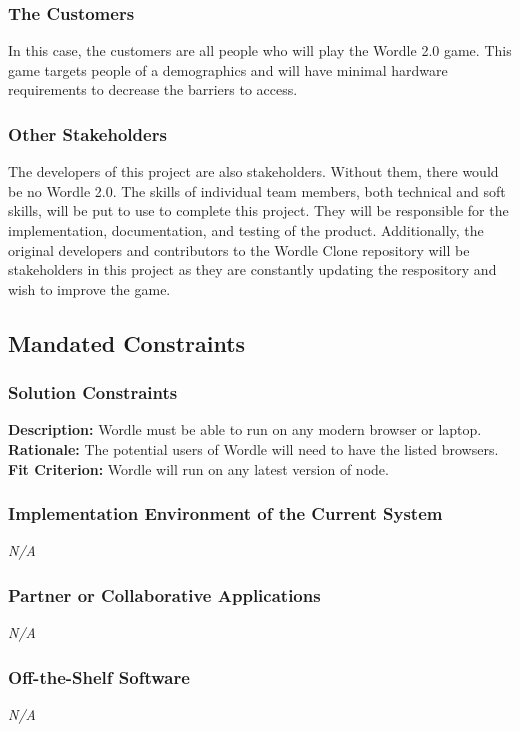 \documentclass[12pt, titlepage]{article}
\begin{document}
	\subsubsection{The Customers}
	In this case, the customers are all people who will play the Wordle 2.0 
	game. 
	This game targets people of a demographics and will have minimal hardware 
	requirements to decrease the barriers to access.
	
	\subsubsection{Other Stakeholders}
	The developers of this project are also stakeholders. Without them, there 
	would 
	be no Wordle 2.0. The skills of individual team members, both technical and 
	soft skills, will be put to use to complete this project. They 
	will be 
	responsible for the implementation, documentation, and testing of the 
	product. 
	Additionally, the original developers and contributors to the Wordle Clone 
	repository will be stakeholders in this project as they are constantly 
	updating the respository and wish to improve the game.
	
	\subsection{Mandated Constraints}
	\subsubsection{Solution Constraints}
	\noindent \textbf{Description:} Wordle must be able to run on any modern 
	browser or laptop.\\
	\textbf{Rationale:} The potential users of Wordle will need to have the 
	listed browsers. \\
	\textbf{Fit Criterion:} Wordle will run on any latest version of node.
	
	\subsubsection{Implementation Environment of the Current System}
	\noindent \emph{N/A}
	
	\subsubsection{Partner or Collaborative Applications}
	\noindent \emph{N/A}
	
	\subsubsection{Off-the-Shelf Software}
	\noindent \emph{N/A}
	
\end{document}
